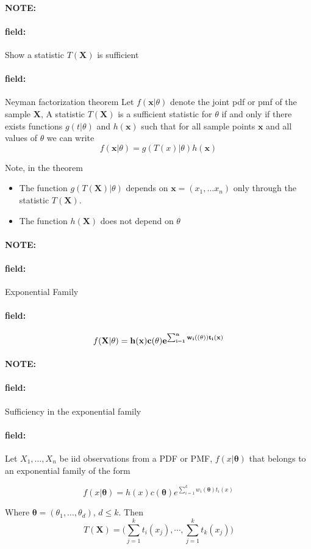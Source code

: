 \documentclass[12pt]{article}
\newenvironment{note}{\paragraph{NOTE:}}{}
\newenvironment{field}{\paragraph{field:}}{}
\begin{document}
\begin{note}
  \begin{field}
    Show a statistic $T(\mathbf{X})$ is sufficient
  \end{field}
  \begin{field}
    Neyman factorization theorem
    Let $f(\mathbf{x}|\theta)$ denote the joint pdf or pmf of the sample $\mathbf{X}$, A statistic $T(\mathbf{X})$ is a sufficient statistic for $\theta$ if and only if there exists functions $g(t|\theta)$ and $h(\mathbf{x})$ such that for all sample points $\mathbf{x}$ and all values of $\theta$ we can write
    $$ f(\mathbf{x}|\theta) = g(T(\mathbf{}x)|\theta)h(\mathbf{x})$$

    Note, in the theorem
    \begin{itemize}
      \item The function $g(T(\mathbf{X})|\theta)$ depends on $\mathbf{x} = (x_1, \ldots x_n)$ only through the statistic $T(\mathbf{X})$.
      \item The function $h(\mathbf{X})$ does not depend on $\theta$
    \end{itemize}
  \end{field}
\end{note}

\begin{note}
  \begin{field}
    Exponential Family
  \end{field}
  \begin{field}
    $$f(\mathbf{X}|\bf{\theta}) = h(\mathbf{x})c(\mathbf{\theta})e^{\sum _{i = 1}^n w_i(\bf(\theta))t_i(x)}$$
  \end{field}
\end{note}




\begin{note}
  \begin{field}
    Sufficiency in the exponential family
  \end{field}
  \begin{field}
    Let $X_1, \ldots , X_n$ be iid observations from a PDF or PMF, $f(x|\boldsymbol\theta)$ that belongs to an exponential family of the form

    $$ f(x|\boldsymbol\theta) = h(x)c(\boldsymbol\theta)e^{\sum _{i = 1}^k w_i(\boldsymbol\theta)t_i(x)}$$

    Where $\boldsymbol\theta = (\theta_1, \ldots, \theta_d)$, $d\leq k$. Then
    $$ T(\mathbf{X}) = \big(\sum _{j = 1}^k t_i(x_j), \cdots , \sum _{j = 1}^k t_k(x_j)\big)$$
  \end{field}
\end{note}
\end{document}
